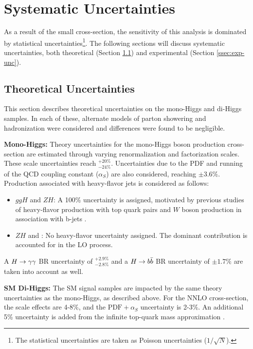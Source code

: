 \section{Systematic Uncertainties}

As a result of the small \hh cross-section, the sensitivity of this analysis is dominated by statistical uncertainties\footnote{The statistical uncertainties are taken as Poisson uncertainties ($1/\sqrt{N}$).}. The following sections will discuss systematic uncertainties, both theoretical (Section \ref{ssec:theory-unc}) and experimental (Section \ref{ssec:exp-unc}).

\subsection{Theoretical Uncertainties} \label{ssec:theory-unc}

This section describes theoretical uncertainties on the mono-Higgs and di-Higgs samples. In each of these, alternate models of parton showering and hadronization were considered and differences were found to be negligible.

\noindent\textbf{Mono-Higgs:} Theory uncertainties for the mono-Higgs boson production cross-section are estimated through varying renormalization and factorization scales. These scale uncertainties reach $^{+20\%}_{-24\%}$. Uncertainties due to the \gls{PDF} and running of the \gls{QCD} coupling constant ($\alpha_{S}$) are also considered, reaching $\pm3.6\%$. Production associated with heavy-flavor jets is considered as follows:

\begin{itemize}
  \item $ggH$ and $ZH$: A 100\% uncertainty is assigned, motivated by previous studies of heavy-flavor production with top quark pairs \cite{heavy-flavor-top} and $W$ boson production in association with b-jets \cite{heavy-flavor-W}.
  \item $ZH$ and \tth: No heavy-flavor uncertainty assigned. The dominant contribution is accounted for in the \gls{LO} process.
\end{itemize}

A $H\rightarrow \gamma\gamma$ \gls{BR} uncertainty of $^{+2.9\%}_{-2.8\%}$ and a $H\rightarrow b\bar{b}$ \gls{BR} uncertainty of $\pm1.7\%$ \cite{hh-crosssections} are taken into account as well.

\noindent\textbf{\gls{SM} Di-Higgs:} The \gls{SM} \hh signal samples are impacted by the same theory uncertainties as the mono-Higgs, as described above. For the \gls{NNLO} cross-section, the scale effects are 4-8\%, and the $\text{PDF}+\alpha_{S}$ uncertainty is 2-3\%. An additional 5\% uncertainty is added from the infinite top-quark mass approximation \cite{nnlo-topquark}.

